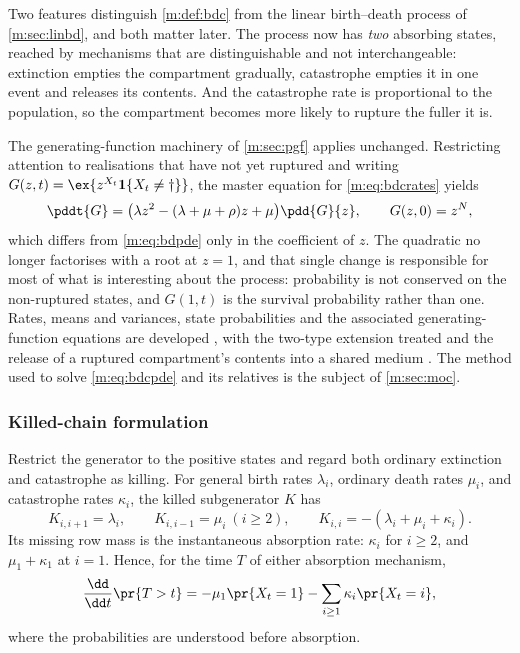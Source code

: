 Two features distinguish \cref{m:def:bdc} from the linear birth--death process of
\cref{m:sec:linbd}, and both matter later. The process now has \emph{two} absorbing
states, reached by mechanisms that are distinguishable and not interchangeable:
extinction empties the compartment gradually, catastrophe empties it in one event
and releases its contents. And the catastrophe rate is proportional to the
population, so the compartment becomes more likely to rupture the fuller it is.

The generating-function machinery of \cref{m:sec:pgf} applies unchanged. Restricting
attention to realisations that have not yet ruptured and writing
$G(z,t) = \ex{z^{X_t}\mathbf 1\{X_t\neq\dagger\}}$, the master equation for
\cref{m:eq:bdcrates} yields
\begin{equation}
\label{m:eq:bdcpde}
\pddt{G} = \bigl(\lambda z^2-(\lambda+\mu+\rho)z+\mu\bigr)\pdd{G}{z},
\qquad G(z,0) = z^{N},
\end{equation}
which differs from \cref{m:eq:bdpde} only in the coefficient of $z$. The quadratic no
longer factorises with a root at $z=1$, and that single change is responsible for
most of what is interesting about the process: probability is not conserved on the
non-ruptured states, and $G(1,t)$ is the survival probability rather than one.
Rates, means and variances, state probabilities and the associated
generating-function equations are developed , with the two-type extension treated
 and the release of a
ruptured compartment's contents into a shared medium
. The method used to solve
\cref{m:eq:bdcpde} and its relatives is the subject of \cref{m:sec:moc}.

\subsubsection*{Killed-chain formulation}
Restrict the generator to the positive states and regard both ordinary extinction
and catastrophe as killing.  For general birth rates \(\lambda_i\), ordinary death
rates \(\mu_i\), and catastrophe rates \(\kappa_i\), the killed subgenerator \(K\)
has
\begin{equation}
 K_{i,i+1}=\lambda_i,\qquad K_{i,i-1}=\mu_i\ (i\ge2),\qquad
 K_{i,i}=-(\lambda_i+\mu_i+\kappa_i).
 \label{m:eq:bdc-subgenerator}
\end{equation}
Its missing row mass is the instantaneous absorption rate: \(\kappa_i\) for
\(i\ge2\), and \(\mu_1+\kappa_1\) at \(i=1\).  Hence, for the time \(T\) of either
absorption mechanism,
\begin{equation}
 \frac{\dd}{\dd t}\pr{T>t}
 =-\mu_1\pr{X_t=1}-\sum_{i\ge1}\kappa_i\pr{X_t=i},
 \label{m:eq:bdc-survival-loss}
\end{equation}
where the probabilities are understood before absorption.

